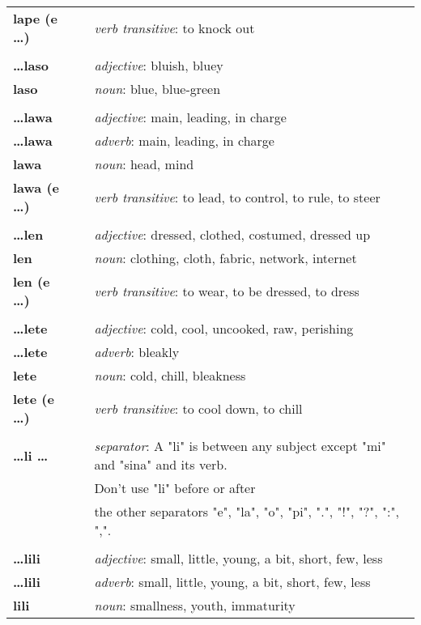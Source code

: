 \begin{supertabular}{p{2,5cm}|ll}
\textbf{lape (e \dots)} && \textit{verb transitive}: to knock out \\ 
 && \\ %
\textbf{\dots laso} && \textit{adjective}: bluish, bluey \\ 
\textbf{laso} && \textit{noun}: blue, blue-green \\ 
 && \\ %
\textbf{\dots lawa} && \textit{adjective}: main, leading, in charge \\ 
\textbf{\dots lawa} && \textit{adverb}: main, leading, in charge \\ 
\textbf{lawa} && \textit{noun}: head, mind \\ 
\textbf{lawa (e \dots)} && \textit{verb transitive}: to lead, to control, to rule, to steer \\ 
 && \\ %
\textbf{\dots len} && \textit{adjective}: dressed, clothed, costumed, dressed up \\ 
\textbf{len} && \textit{noun}: clothing, cloth, fabric, network, internet \\ 
\textbf{len (e \dots)} && \textit{verb transitive}: to wear, to be dressed, to dress \\ 
 && \\ %
\textbf{\dots lete} && \textit{adjective}: cold, cool, uncooked, raw, perishing \\ 
\textbf{\dots lete} && \textit{adverb}: bleakly \\ 
\textbf{lete} && \textit{noun}: cold, chill, bleakness \\ 
\textbf{lete (e \dots)} && \textit{verb transitive}: to cool down, to chill \\ 
 && \\ %
\textbf{\dots li \dots} && \textit{separator}: A "li" is between any subject except "mi" and "sina" and its verb. \\ && Don't use "li" before or after \\ && the other separators "e", "la", "o", "pi", ".", "!", "?", ":", ",". \\ 
 && \\ %
\textbf{\dots lili} && \textit{adjective}: small, little, young, a bit, short, few, less \\ 
\textbf{\dots lili} && \textit{adverb}: small, little, young, a bit, short, few, less \\ 
\textbf{lili} && \textit{noun}: smallness, youth, immaturity \\ 

\end{supertabular}
